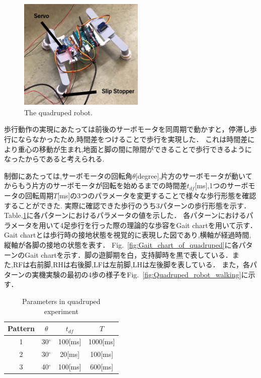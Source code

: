 \documentclass[uplatex,dvipdfmx]{jlreq}
\begin{document}
\begin{figure}[t]
    \centering
    \includegraphics[width=60mm]{./figure/4legbot.png}
    \caption{The quadruped robot.}
    \label{fig:quadruped_robot}
\end{figure}

歩行動作の実現にあたっては前後のサーボモータを同周期で動かすと，停滞し歩行にならなかったため,時間差をつけることで歩行を実現した．
これは時間差により重心の移動が生まれ,地面と脚の間に隙間ができることで歩行できるようになったからであると考えられる.

制御にあたっては,サーボモータの回転角$\theta$[degree],片方のサーボモータが動いてからもう片方のサーボモータが回転を始めるまでの時間差$t_{df}$[ms],1つのサーボモータの回転周期$T$[ms]の3つのパラメータを変更することで様々な歩行形態を確認することができた.
実際に確認できた歩行のうち3パターンの歩行形態を示す．
Table.\ref{table:Parameters_in_quadruped_experiment}に各パターンにおけるパラメータの値を示した．
各パターンにおけるパラメータを用いて4足歩行を行った際の理論的な歩容をGait chartを用いて示す．
Gait chartとは歩行時の接地状態を視覚的に表現した図であり,横軸が経過時間,縦軸が各脚の接地の状態を表す．
Fig.~\ref{fig:Gait_chart_of_quadruped}に各パターンのGait chartを示す．脚の遊脚期を白，支持脚時を黒で表している．また,RFは右前脚,RHは右後脚,LFは左前脚,LHは左後脚を表している．
また，各パターンの実機実験の最初の4歩の様子をFig.~\ref{fig:Quadruped_robot_walking}に示す．


\begin{table}
    \caption{Parameters in quadruped experiment}
     \label{table:Parameters_in_quadruped_experiment}
     \centering
     \begin{tabular}{cccc}\hline
      Pattern & $\theta$ & $t_{df}$ & $T$ \\ \hline 
     1 & 30$^\circ$ & 100[ms] & 1000[ms] \\ 
     2 & 30$^\circ$ & 20[ms] & 100[ms] \\ 
     3 & 40$^\circ$ & 100[ms] & 600[ms] \\ \hline    
     \end{tabular}
  \end{table}
\end{document}
